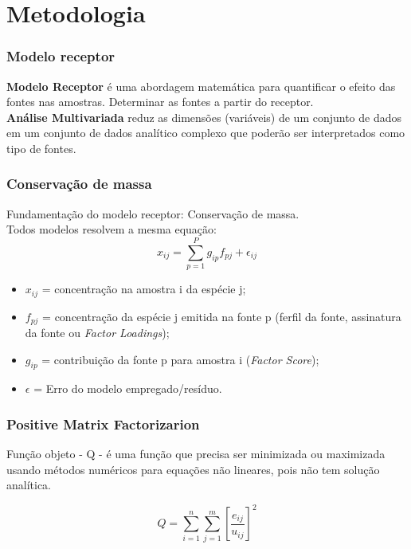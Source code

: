 \section{Metodologia}

\begin{frame}
  \frametitle{Modelo receptor}
  \textbf{Modelo Receptor} é uma abordagem matemática para quantificar o efeito das fontes 
  nas amostras. Determinar as fontes a partir do receptor. \\
  \textbf{Análise Multivariada} reduz as dimensões (variáveis) de um conjunto de dados 
  em um conjunto de dados analítico complexo que poderão ser interpretados como 
  tipo de fontes.
\end{frame}

\begin{frame}
  \frametitle{Conservação de massa}
  Fundamentação do modelo receptor: Conservação de massa. \\
  Todos modelos resolvem a mesma equação: 
  \begin{equation}
    x_{ij} = \sum_{p=1}^{P} g_{ip}f_{pj} + \epsilon_{ij}
  \end{equation} 
 
  \begin{itemize}
    \item $x_{ij}$ = concentração na amostra i da espécie j;
    \item $f_{pj}$ = concentração da espécie j emitida na fonte p 
                    (ferfil da fonte, assinatura da fonte ou \textit{Factor Loadings}); 
    \item $g_{ip}$ = contribuição da fonte p para amostra i (\textit{Factor Score});
    \item $\epsilon$ = Erro do modelo empregado/resíduo.
  \end{itemize}
\end{frame}

\begin{frame}
  \frametitle{Positive Matrix Factorizarion}

  Função objeto - Q -  é uma função que precisa ser minimizada 
  ou maximizada usando métodos numéricos para equações não lineares, pois não 
  tem solução analítica. 

  \begin{equation}
    Q = \sum_{i=1}^n \sum_{j=1}^m  \left[ \frac{e_{ij}} {u_{ij}} \right] ^2
  \end{equation}
\end{frame}

